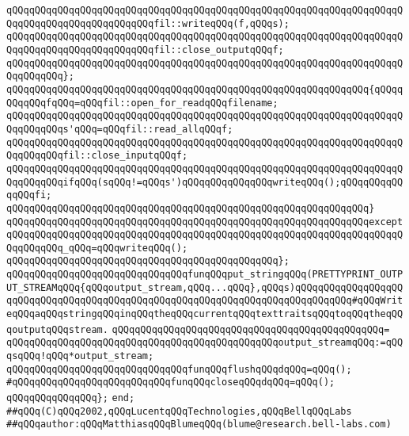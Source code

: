 \verb|qQQqqQQqqQQqqQQqqQQqqQQqqQQqqQQqqQQqqQQqqQQqqQQqqQQqqQQqqQQqqQQqqQQqqQQqqQQqqQQqqQQqqQQqqQQqqQQqfil::writeqQQq(f,qQQqs);|\newline
\verb|qQQqqQQqqQQqqQQqqQQqqQQqqQQqqQQqqQQqqQQqqQQqqQQqqQQqqQQqqQQqqQQqqQQqqQQqqQQqqQQqqQQqqQQqqQQqqQQqfil::close_outputqQQqf;|\newline
\verb|qQQqqQQqqQQqqQQqqQQqqQQqqQQqqQQqqQQqqQQqqQQqqQQqqQQqqQQqqQQqqQQqqQQqqQQqqQQqqQQq};|\newline
\newline
\verb|qQQqqQQqqQQqqQQqqQQqqQQqqQQqqQQqqQQqqQQqqQQqqQQqqQQqqQQqqQQqqQQq{qQQqqQQqqQQqfqQQq=qQQqfil::open_for_readqQQqfilename;|\newline
\verb|qQQqqQQqqQQqqQQqqQQqqQQqqQQqqQQqqQQqqQQqqQQqqQQqqQQqqQQqqQQqqQQqqQQqqQQqqQQqqQQqs'qQQq=qQQqfil::read_allqQQqf;|\newline
\newline
\verb|qQQqqQQqqQQqqQQqqQQqqQQqqQQqqQQqqQQqqQQqqQQqqQQqqQQqqQQqqQQqqQQqqQQqqQQqqQQqqQQqfil::close_inputqQQqf;|\newline
\newline
\verb|qQQqqQQqqQQqqQQqqQQqqQQqqQQqqQQqqQQqqQQqqQQqqQQqqQQqqQQqqQQqqQQqqQQqqQQqqQQqqQQqifqQQq(sqQQq!=qQQqs')qQQqqQQqqQQqqQQqwriteqQQq();qQQqqQQqqQQqqQQqfi;|\newline
\verb|qQQqqQQqqQQqqQQqqQQqqQQqqQQqqQQqqQQqqQQqqQQqqQQqqQQqqQQqqQQqqQQq}|\newline
\verb|qQQqqQQqqQQqqQQqqQQqqQQqqQQqqQQqqQQqqQQqqQQqqQQqqQQqqQQqqQQqqQQqexcept|\newline
\verb|qQQqqQQqqQQqqQQqqQQqqQQqqQQqqQQqqQQqqQQqqQQqqQQqqQQqqQQqqQQqqQQqqQQqqQQqqQQqqQQq_qQQq=qQQqwriteqQQq();|\newline
\verb|qQQqqQQqqQQqqQQqqQQqqQQqqQQqqQQqqQQqqQQqqQQqqQQq};|\newline
\newline
\verb|qQQqqQQqqQQqqQQqqQQqqQQqqQQqqQQqfunqQQqput_stringqQQq(PRETTYPRINT_OUTPUT_STREAMqQQq{qQQqoutput_stream,qQQq...qQQq},qQQqs)qQQqqQQqqQQqqQQqqQQqqQQqqQQqqQQqqQQqqQQqqQQqqQQqqQQqqQQqqQQqqQQqqQQqqQQqqQQqqQQq#qQQqWriteqQQqaqQQqstringqQQqinqQQqtheqQQqcurrentqQQqtexttraitsqQQqtoqQQqtheqQQqoutputqQQqstream.|\newline
\verb|qQQqqQQqqQQqqQQqqQQqqQQqqQQqqQQqqQQqqQQqqQQqqQQq=|\newline
\verb|qQQqqQQqqQQqqQQqqQQqqQQqqQQqqQQqqQQqqQQqqQQqqQQqoutput_streamqQQq:=qQQqsqQQq!qQQq*output_stream;|\newline
\newline
\verb|qQQqqQQqqQQqqQQqqQQqqQQqqQQqqQQqfunqQQqflushqQQqdqQQq=qQQq();|\newline
\verb|#qQQqqQQqqQQqqQQqqQQqqQQqqQQqfunqQQqcloseqQQqdqQQq=qQQq();|\newline
\verb|qQQqqQQqqQQqqQQq};|\newline
\verb|end;|\newline
\newline
\newline
\verb|##qQQq(C)qQQq2002,qQQqLucentqQQqTechnologies,qQQqBellqQQqLabs|\newline
\verb|##qQQqauthor:qQQqMatthiasqQQqBlumeqQQq(blume@research.bell-labs.com)|\newline

